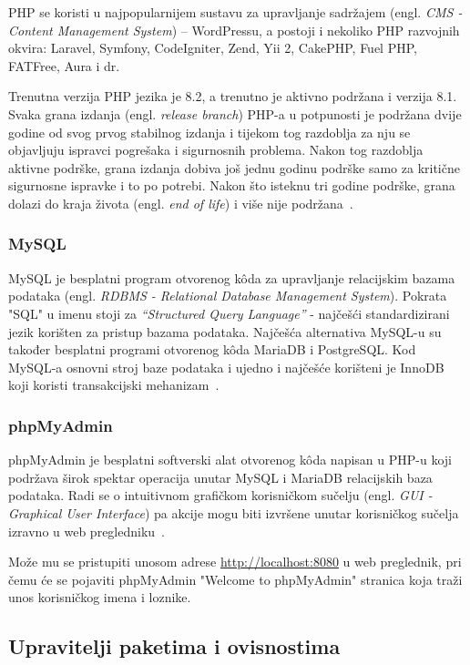 PHP se koristi u najpopularnijem sustavu za upravljanje
sadržajem (engl. \textit{CMS - Content Management System}) – WordPressu, a postoji i nekoliko PHP razvojnih okvira: Laravel, Symfony, CodeIgniter, Zend, Yii 2, CakePHP, Fuel PHP, FATFree, Aura i dr.~\cite{Brekalo}

Trenutna verzija PHP jezika je 8.2, a trenutno je aktivno podržana i verzija 8.1. Svaka grana izdanja (engl. \textit{release branch}) PHP-a u potpunosti je podržana dvije godine od svog prvog stabilnog izdanja i tijekom tog razdoblja za nju se objavljuju ispravci pogrešaka i sigurnosnih problema. Nakon tog razdoblja aktivne podrške, grana izdanja dobiva još jednu godinu podrške samo za kritične sigurnosne ispravke i to po potrebi. Nakon što isteknu tri godine podrške, grana dolazi do kraja života (engl. \textit{end of life}) i više nije podržana~\cite{phpVersions}.

\subsubsection{MySQL}
MySQL je besplatni program otvorenog k\^oda za upravljanje relacijskim bazama podataka (engl. \textit{RDBMS - Relational Database Management System}). Pokrata "SQL" u imenu stoji za \textit{“Structured Query Language”} - najčešći standardizirani jezik korišten za pristup bazama podataka. Najčešća alternativa MySQL-u su također besplatni programi otvorenog k\^oda MariaDB i PostgreSQL. Kod MySQL-a osnovni stroj baze podataka i ujedno i najčešće korišteni je InnoDB koji koristi transakcijski mehanizam~\cite{Brekalo}.

\subsubsection{phpMyAdmin}
phpMyAdmin je besplatni softverski alat otvorenog k\^oda napisan u PHP-u koji podržava širok spektar operacija unutar MySQL i MariaDB relacijskih baza podataka. Radi se o intuitivnom grafičkom korisničkom sučelju (engl. \textit{GUI - Graphical User Interface}) pa akcije mogu biti izvršene unutar korisničkog sučelja izravno u web pregledniku~\cite{Brekalo}.

Može mu se pristupiti unosom adrese \url{http://localhost:8080} u web preglednik, pri čemu će se pojaviti phpMyAdmin "Welcome to phpMyAdmin" stranica koja traži unos korisničkog imena i loznike.

\subsection{Upravitelji paketima i ovisnostima}

